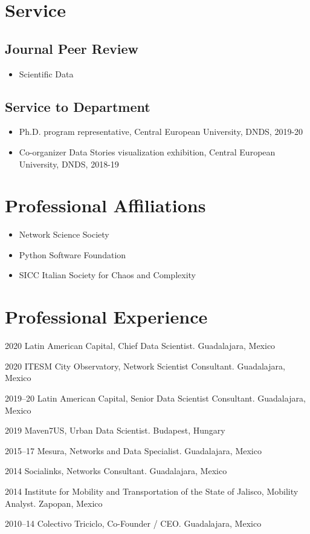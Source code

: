 \documentclass{academiccv}
\begin{document}
\section*{Service}
\subsection*{Journal Peer Review}
\begin{itemize}
  \item Scientific Data
\end{itemize}

\subsection*{Service to Department}
\begin{itemize}
	\item Ph.D. program representative, Central European University, DNDS, 2019-20
	\item Co-organizer Data Stories visualization exhibition, Central European University, DNDS, 2018-19
\end{itemize}

\section*{Professional Affiliations}
\begin{itemize}
	\item Network Science Society
	\item Python Software Foundation
	\item SICC Italian Society for Chaos and Complexity
\end{itemize}


\section*{Professional Experience}
\begin{tablist}
	\item[2020] \tab Latin American Capital, Chief Data Scientist. Guadalajara, Mexico
	\item[2020] \tab ITESM City Observatory, Network Scientist Consultant. Guadalajara, Mexico
	\item[2019--20] \tab Latin American Capital, Senior Data Scientist Consultant. Guadalajara, Mexico
	\item[2019] \tab Maven7US, Urban Data Scientist. Budapest, Hungary
	\item[2015--17] \tab Mesura, Networks and Data Specialist. Guadalajara, Mexico
	\item[2014] \tab Socialinks, Networks Consultant. Guadalajara, Mexico
	\item[2014] \tab Institute for Mobility and Transportation of the State of Jalisco, Mobility Analyst. Zapopan, Mexico
	\item[2010--14] \tab Colectivo Triciclo, Co-Founder / CEO. Guadalajara, Mexico
\end{tablist}
\end{document}
